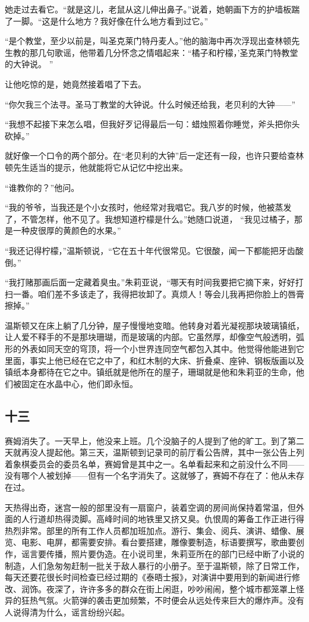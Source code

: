 她走过去看它。``就是这儿，老鼠从这儿伸出鼻子。''说着，她朝画下方的护墙板踹了一脚。``这是什么地方？我好像在什么地方看到过它。''

``是个教堂，至少以前是，叫圣克莱门特丹麦人。''他的脑海中再次浮现出查林顿先生教的那几句歌谣，他带着几分怀念之情唱起来：``橘子和柠檬，'圣克莱门特教堂的大钟说。
''

让他吃惊的是，她竟然接着唱了下去。

``你欠我三个法寻。圣马丁教堂的大钟说。什么时候还给我，老贝利的大钟------''

``我想不起接下来怎么唱，但我好歹记得最后一句：蜡烛照着你睡觉，斧头把你头砍掉。''

就好像一个口令的两个部分。在``老贝利的大钟''后一定还有一段，也许只要给查林顿先生适当的提示，他就能将它从记忆中挖出来。

``谁教你的？''他问。

``我的爷爷，当我还是个小女孩时，他经常对我唱它。我八岁的时候，他被蒸发了，不管怎样，他不见了。我想知道柠檬是什么。''她随口说道，
``我见过橘子，那是一种皮很厚的黄颜色的水果。''

``我还记得柠檬，''温斯顿说，``它在五十年代很常见。它很酸，闻一下都能把牙齿酸倒。''

``我打赌那画后面一定藏着臭虫。''朱莉亚说，``哪天有时间我要把它摘下来，好好打扫一番。咱们差不多该走了，我得把妆卸了。真烦人！等会儿我再把你脸上的唇膏擦掉。''

温斯顿又在床上躺了几分钟，屋子慢慢地变暗。他转身对着光凝视那块玻璃镇纸，让人爱不释手的不是那块珊瑚，而是玻璃的内部。它虽然厚，却像空气般透明，弧形的外表如同天空的穹顶，将一个小世界连同空气都包入其中。他觉得他能进到它里面，事实上他已经在它之中了，和红木制的大床、折叠桌、座钟、钢板版画以及镇纸本身都待在它之中。镇纸就是他所在的屋子，珊瑚就是他和朱莉亚的生命，他们被固定在水晶中心，他们即永恒。

\subsection{十三}\label{ux5341ux4e09}

赛姆消失了。一天早上，他没来上班。几个没脑子的人提到了他的旷工。到了第二天就再没人提起他。第三天，温斯顿到记录司的前厅看公告牌，其中一张公告上列着象棋委员会的委员名单，赛姆曾是其中之一。名单看起来和之前没什么不同------没有哪个人被划掉------但有一个名字消失了。这就够了，赛姆不存在了：他从未存在过。

天热得出奇，迷宫一般的部里没有一扇窗户，装着空调的房间尚保持着常温，但外面的人行道却热得烫脚。高峰时间的地铁里又挤又臭。仇恨周的筹备工作正进行得热烈非常。部里的所有工作人员都加班加点。游行、集会、阅兵、演讲、蜡像、展览、电影、电屏，都需要安排。看台要搭建，雕像要制造，标语要撰写，歌曲要创作，谣言要传播，照片要伪造。在小说司里，朱莉亚所在的部门已经中断了小说的制造，人们急匆匆赶制一批关于敌人暴行的小册子。至于温斯顿，除了日常工作，每天还要花很长时间检查已经过期的《泰晤士报》，对演讲中要用到的新闻进行修改、润饰。夜深了，许许多多的群众在街上闲逛，吵吵闹闹，整个城市都笼罩上怪异的狂热气氛。火箭弹的袭击更加频繁，不时便会从远处传来巨大的爆炸声。没有人说得清为什么，谣言纷纷兴起。

